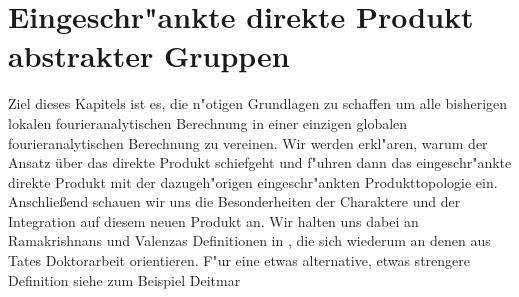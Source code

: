 \section{Eingeschr"ankte direkte Produkt abstrakter Gruppen}\label{sec:rdp}
	Ziel dieses Kapitels ist es, die n"otigen Grundlagen zu schaffen um alle bisherigen lokalen fourieranalytischen Berechnung in einer einzigen globalen fourieranalytischen Berechnung zu vereinen. 
	Wir werden erkl"aren, warum der Ansatz über das direkte Produkt schiefgeht und f"uhren dann das eingeschr"ankte direkte Produkt mit der dazugeh"origen eingeschr"ankten Produkttopologie ein.
	Anschließend schauen wir uns die Besonderheiten der Charaktere und der Integration auf diesem neuen Produkt an. 
	Wir halten uns dabei an Ramakrishnans und Valenzas Definitionen in \cite{rama}, die sich wiederum an denen aus Tates Doktorarbeit \cite{tate} orientieren.
	F"ur eine etwas alternative, etwas strengere Definition siehe zum Beispiel Deitmar \cite{deitmar2010}
